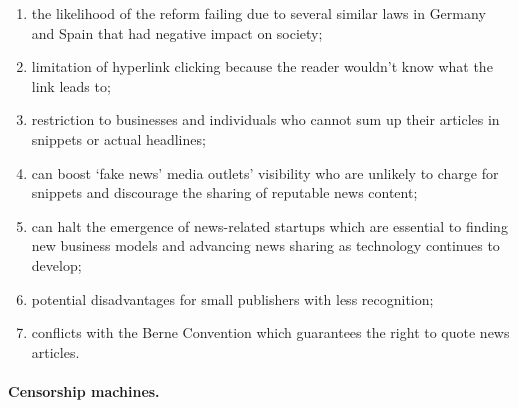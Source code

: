 \documentclass[a4paper]{article}
\begin{document}
\begin{enumerate}
\item the likelihood of the reform failing due to several similar laws in Germany and Spain that had negative impact on society;
\item limitation of hyperlink clicking because the reader wouldn't know what the link leads to;
\item restriction to businesses and individuals who cannot sum up their articles in snippets or actual headlines;
\item can boost `fake news' media outlets' visibility who are unlikely to charge for snippets and discourage the sharing of reputable news content;
\item can halt the emergence of news-related startups which are essential to finding new business models and advancing news sharing as technology continues to develop;
\item potential disadvantages for small publishers with less recognition;
\item conflicts with the Berne Convention which guarantees the right to quote news articles.
\end{enumerate}

\paragraph{Censorship machines.} 
\end{document}
